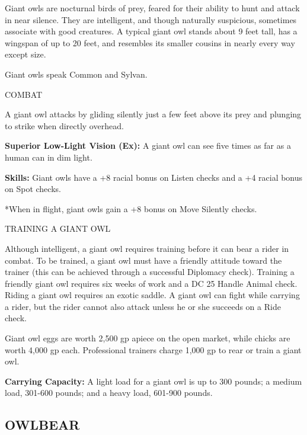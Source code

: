 \documentclass{article}
\begin{document}
Giant owls are nocturnal birds of prey, feared for their ability to hunt and attack 
in near silence. They are intelligent, and though naturally suspicious, sometimes 
associate with good creatures.  A typical giant owl stands about 9 feet tall, has 
a wingspan of up to 20 feet, and resembles its smaller cousins in nearly every 
way except size.

Giant owls speak Common and Sylvan.

COMBAT

A giant owl attacks by gliding silently just a few feet above its prey and plunging 
to strike when directly overhead.

\textbf{Superior Low-Light Vision (Ex):} A giant owl can see five times as far 
as a human can in dim light.

\textbf{Skills:} Giant owls have a +8 racial bonus on Listen checks and a +4 racial 
bonus on Spot checks.

*When in flight, giant owls gain a +8 bonus on Move Silently checks.

TRAINING A GIANT OWL

Although intelligent, a giant owl requires training before it can bear a rider 
in combat. To be trained, a giant owl must have a friendly attitude toward the 
trainer (this can be achieved through a successful Diplomacy check). Training a 
friendly giant owl requires six weeks of work and a DC 25 Handle Animal check. 
Riding a giant owl requires an exotic saddle. A giant owl can fight while carrying 
a rider, but the rider cannot also attack unless he or she succeeds on a Ride check.

Giant owl eggs are worth 2,500 gp apiece on the open market, while chicks are worth 
4,000 gp each. Professional trainers charge 1,000 gp to rear or train a giant owl.

\textbf{Carrying Capacity:} A light load for a giant owl is up to 300 pounds; a 
medium load, 301-600 pounds; and a heavy load, 601-900 pounds.

\vspace{12pt}
\subsection*{{\LARGE{}OWLBEAR}}
\end{document}
